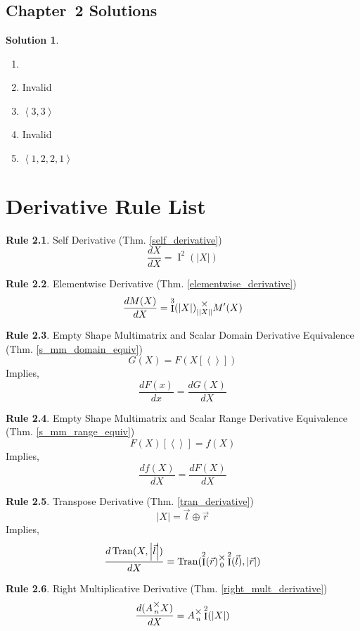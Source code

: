 \documentclass[12pt]{book}
\theoremstyle{plain}
\theoremstyle{definition}
\newtheorem{drule}{Rule}
\theoremstyle{ppart}
\theoremstyle{case}
\newcounter{solutionctr}
\theoremstyle{solution}
\newtheorem{solution}{Solution}
\newcommand{\solutionsection}[1]{
  \section{Chapter~#1 Solutions}\setcounter{solutionctr}{0}}
\DeclareMathOperator{\Ident}{I}
\DeclareMathOperator{\Tran}{Tran}
\newcommand{\mmult}[1]{\text{\raisebox{1ex}{$\underset{#1}{\times}$}}}
\newcommand{\shape}[1]{\left|#1\right|}
\begin{document}
\begin{appendices}
\solutionsection{2}

\begin{solution}
\begin{enumerate}
\item[]
\item Invalid
\item $\left<3, 3\right>$
\item Invalid
\item $\left<1, 2, 2, 1\right>$
\end{enumerate}
\end{solution}

\chapter{Derivative Rule List}

\begin{drule}
Self Derivative (Thm. \ref{self_derivative})
\[ \frac{dX}{dX} = \Ident^2(\shape{X}) \]
\end{drule}

\begin{drule}
Elementwise Derivative (Thm. \ref{elementwise_derivative})
\[ \frac{dM(X)}{dX} = \Ident^3(\shape{X}) \mmult{\shape{\shape{X}}} M'(X) \]
\end{drule}

\begin{drule}
Empty Shape Multimatrix and Scalar Domain Derivative Equivalence
(Thm. \ref{s_mm_domain_equiv})
\[ G(X) = F(X[\left<\right>]) \]
Implies,
\[ \frac{dF(x)}{dx} = \frac{dG(X)}{dX} \]
\end{drule}

\begin{drule}
Empty Shape Multimatrix and Scalar Range Derivative Equivalence
(Thm. \ref{s_mm_range_equiv})
\[ F(X)[\left<\right>] = f(X) \]
Implies,
\[ \frac{df(X)}{dX} = \frac{dF(X)}{dX} \]
\end{drule}

\begin{drule}
Transpose Derivative
(Thm. \ref{tran_derivative})
\[ \shape{X} = \vec{l} \oplus \vec{r} \]
Implies,
\[
 \frac{d\Tran(X, \shape{\vec{l}})}{dX} =
 \Tran(\Ident^2(\vec{r}) \mmult{0} \Ident^2(\vec{l}), \shape{\vec{r}})
\]
\end{drule}

\begin{drule}
Right Multiplicative Derivative
(Thm. \ref{right_mult_derivative})
\[ \frac{d(A \mmult{n} X)}{dX} = A \mmult{n} \Ident^2(\shape{X}) \]
\end{drule}


\end{appendices}
\end{document}
